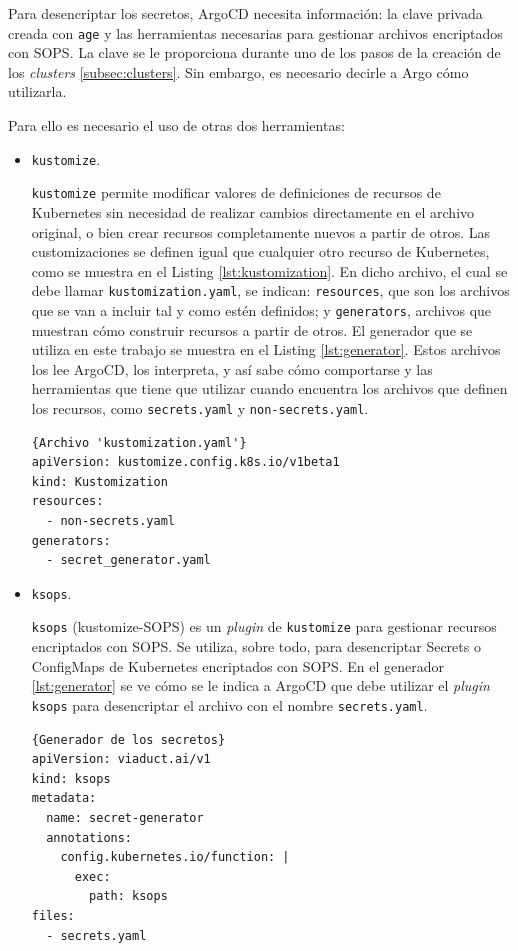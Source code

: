 Para desencriptar los secretos, ArgoCD necesita información: la clave privada creada con \texttt{age} y las herramientas necesarias para gestionar archivos encriptados con SOPS. La clave se le proporciona durante uno de los pasos de la creación de los \textit{clusters} \ref{subsec:clusters}. Sin embargo, es necesario decirle a Argo cómo utilizarla.

Para ello es necesario el uso de otras dos herramientas:

\begin{itemize}
  \item \texttt{kustomize}\cite{kustomize}.

    \texttt{kustomize} permite modificar valores de definiciones de recursos de Kubernetes sin necesidad de realizar cambios directamente en el archivo original, o bien crear recursos completamente nuevos a partir de otros. Las customizaciones se definen igual que cualquier otro recurso de Kubernetes, como se muestra en el Listing \ref{lst:kustomization}. En dicho archivo, el cual se debe llamar \texttt{kustomization.yaml}, se indican: \texttt{resources}, que son los archivos que se van a incluir tal y como estén definidos; y \texttt{generators}, archivos que muestran cómo construir recursos a partir de otros. El generador que se utiliza en este trabajo se muestra en el Listing \ref{lst:generator}. Estos archivos los lee ArgoCD, los interpreta, y así sabe cómo comportarse y las herramientas que tiene que utilizar cuando encuentra los archivos que definen los recursos, como \texttt{secrets.yaml} y \texttt{non-secrets.yaml}.

\begin{lstlisting}[language=helm,label=lst:kustomization]{Archivo 'kustomization.yaml'}
apiVersion: kustomize.config.k8s.io/v1beta1
kind: Kustomization
resources:
  - non-secrets.yaml
generators:
  - secret_generator.yaml
\end{lstlisting}

  \item \texttt{ksops}\cite{ksops}.

    \texttt{ksops} (kustomize-SOPS) es un \textit{plugin} de \texttt{kustomize} para gestionar recursos encriptados con SOPS. Se utiliza, sobre todo, para desencriptar Secrets o ConfigMaps de Kubernetes encriptados con SOPS. En el generador \ref{lst:generator} se ve cómo se le indica a ArgoCD que debe utilizar el \textit{plugin}  \texttt{ksops} para desencriptar el archivo con el nombre \texttt{secrets.yaml}.

\begin{lstlisting}[language=helm,label=lst:generator]{Generador de los secretos}
apiVersion: viaduct.ai/v1
kind: ksops
metadata:
  name: secret-generator
  annotations:
    config.kubernetes.io/function: |
      exec:
        path: ksops
files:
  - secrets.yaml
\end{lstlisting}

\end{itemize}

